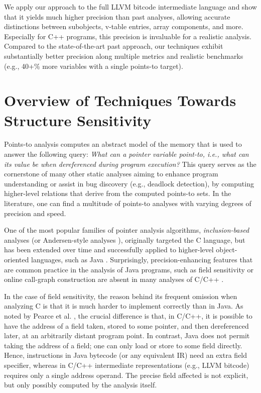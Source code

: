 
We apply our approach to the full LLVM bitcode intermediate language
and show that it yields much higher precision than past analyses,
allowing accurate distinctions between subobjects, v-table entries,
array components, and more. Especially for C++ programs, this
precision is invaluable for a realistic analysis. Compared to the
state-of-the-art past approach, our techniques exhibit substantially
better precision along multiple metrics and realistic benchmarks
(e.g., 40+\% more variables with a single points-to target).


\section{Overview of Techniques Towards Structure Sensitivity}
\label{structsens/sect/overview}

Points-to analysis computes an abstract model of the memory that is
used to answer the following query: \emph{What can a pointer variable
  point-to, i.e., what can its value be when dereferenced during
  program execution?}  This query serves as the cornerstone of
many other static analyses aiming to enhance program understanding or
assist in bug discovery (e.g., deadlock detection), by computing
higher-level relations that derive from the computed points-to
sets. In the literature, one can find a multitude of points-to
analyses with varying degrees of precision and speed.

One of the most popular families of pointer analysis algorithms,
\emph{inclusion-based} analyses (or Andersen-style analyses
\cite{andersen:thesis}), originally targeted the C language, but has
been extended over time and successfully applied to higher-level
object-oriented languages, such as Java
\cite{pldi/BerndlLQHU03,oopsla/BravenboerS09,issta/MilanovaRR02,oopsla/RountevMR01,oopsla/WhaleyR99}.
Surprisingly, precision-enhancing features that are common practice in
the analysis of Java programs, such as field sensitivity or online
call-graph construction are absent in many analyses of C/C++
\cite{antgrasshopper,toplas/HindBCC99,popl/ZhengR08,pldi/HeintzeT01a,pldi/Das00,sas/HardekopfL07}.


In the case of field sensitivity, the reason behind its frequent
omission when analyzing C is that it is much harder to implement
correctly than in Java. As noted by Pearce et
al. \cite{toplas/PearceKH07}, the crucial difference is that, in C/C++,
it is possible to have the address of a field taken, stored to some
pointer, and then dereferenced later, at an arbitrarily distant
program point. In contrast, Java does not permit taking the address of
a field; one can only load or store to some field directly. Hence,
 instructions in Java bytecode (or any equivalent IR)
need an extra field specifier, whereas in C/C++ intermediate
representations (e.g., LLVM bitcode)  requires only a
single address operand. The precise field affected is not explicit, but
only possibly computed by the analysis itself.

